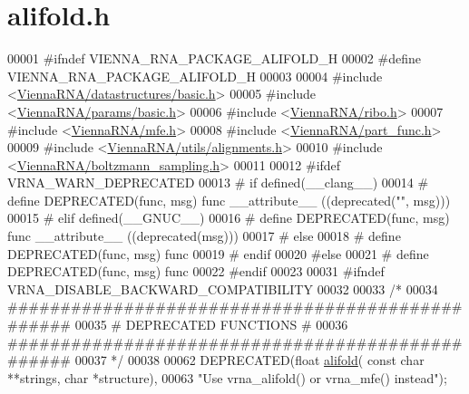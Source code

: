 \hypertarget{alifold_8h_source}{}\section{alifold.\+h}
\label{alifold_8h_source}

\begin{DoxyCode}
00001 \textcolor{preprocessor}{#ifndef VIENNA\_RNA\_PACKAGE\_ALIFOLD\_H}
00002 \textcolor{preprocessor}{#define VIENNA\_RNA\_PACKAGE\_ALIFOLD\_H}
00003 
00004 \textcolor{preprocessor}{#include <\hyperlink{datastructures_2basic_8h}{ViennaRNA/datastructures/basic.h}>}
00005 \textcolor{preprocessor}{#include <\hyperlink{params_2basic_8h}{ViennaRNA/params/basic.h}>}
00006 \textcolor{preprocessor}{#include <\hyperlink{ribo_8h}{ViennaRNA/ribo.h}>}
00007 \textcolor{preprocessor}{#include <\hyperlink{mfe_8h}{ViennaRNA/mfe.h}>}
00008 \textcolor{preprocessor}{#include <\hyperlink{part__func_8h}{ViennaRNA/part\_func.h}>}
00009 \textcolor{preprocessor}{#include <\hyperlink{utils_2alignments_8h}{ViennaRNA/utils/alignments.h}>}
00010 \textcolor{preprocessor}{#include <\hyperlink{boltzmann__sampling_8h}{ViennaRNA/boltzmann\_sampling.h}>}
00011 
00012 \textcolor{preprocessor}{#ifdef VRNA\_WARN\_DEPRECATED}
00013 \textcolor{preprocessor}{# if defined(\_\_clang\_\_)}
00014 \textcolor{preprocessor}{#  define DEPRECATED(func, msg) func \_\_attribute\_\_ ((deprecated("", msg)))}
00015 \textcolor{preprocessor}{# elif defined(\_\_GNUC\_\_)}
00016 \textcolor{preprocessor}{#  define DEPRECATED(func, msg) func \_\_attribute\_\_ ((deprecated(msg)))}
00017 \textcolor{preprocessor}{# else}
00018 \textcolor{preprocessor}{#  define DEPRECATED(func, msg) func}
00019 \textcolor{preprocessor}{# endif}
00020 \textcolor{preprocessor}{#else}
00021 \textcolor{preprocessor}{# define DEPRECATED(func, msg) func}
00022 \textcolor{preprocessor}{#endif}
00023 
00031 \textcolor{preprocessor}{#ifndef VRNA\_DISABLE\_BACKWARD\_COMPATIBILITY}
00032 
00033 \textcolor{comment}{/*}
00034 \textcolor{comment}{#################################################}
00035 \textcolor{comment}{# DEPRECATED FUNCTIONS                          #}
00036 \textcolor{comment}{#################################################}
00037 \textcolor{comment}{*/}
00038 
00062 DEPRECATED(\textcolor{keywordtype}{float} \hyperlink{group__mfe__global__deprecated_ga4cf00f0659e5f0480335d69e797f05b1}{alifold}( \textcolor{keyword}{const} \textcolor{keywordtype}{char} **strings, \textcolor{keywordtype}{char} *structure),
00063           \textcolor{stringliteral}{"Use vrna\_alifold() or vrna\_mfe() instead"});

\end{DoxyCode}
